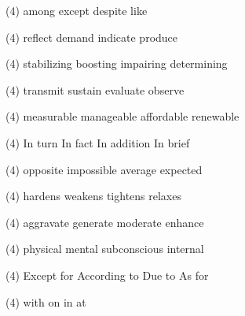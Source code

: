 \item
\begin{tasks}(4)
	\task among
	\task except
	\task despite
	\task like
\end{tasks}
\item
\begin{tasks}(4)
	\task reflect
	\task demand
	\task indicate
	\task produce
\end{tasks}
\item
\begin{tasks}(4)
	\task stabilizing
	\task boosting
	\task impairing
	\task determining
\end{tasks}
\item
\begin{tasks}(4)
	\task transmit
	\task sustain
	\task evaluate
	\task observe
\end{tasks}
\item
\begin{tasks}(4)
	\task measurable
	\task manageable
	\task affordable
	\task renewable
\end{tasks}
\item
\begin{tasks}(4)
	\task In turn
	\task In fact
	\task In addition
	\task In brief
\end{tasks}
\item
\begin{tasks}(4)
	\task opposite
	\task impossible
	\task average
	\task expected
\end{tasks}
\item
\begin{tasks}(4)
	\task hardens
	\task weakens
	\task tightens
	\task relaxes
\end{tasks}
\item
\begin{tasks}(4)
	\task aggravate
	\task generate
	\task moderate
	\task enhance
\end{tasks}
\item
\begin{tasks}(4)
	\task physical
	\task mental
	\task subconscious
	\task internal
\end{tasks}
\item
\begin{tasks}(4)
	\task Except for
	\task According to
	\task Due to
	\task As for
\end{tasks}
\item
\begin{tasks}(4)
	\task with
	\task on
	\task in
	\task at
\end{tasks}
